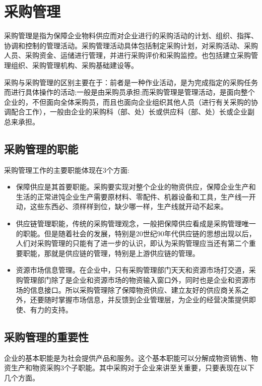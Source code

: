 \section {采购管理}

    采购管理是指为保障企业物料供应而对企业进行的采购活动的计划、组织、指挥、协调和控制的管理活动。采购管理活动具体包括制定采购计划，对采购活动、采购人员、采购资金、运储进行管理，并进行采购评价和采购监控。也包括建立采购管理组织、采购管理机构、采购基础建设等。

    采购与采购管理的区别主要在于：前者是一种作业活动，是为完成指定的采购任务而进行具体操作的活动;一般是由采购员承担;而采购管理是管理活动，是面向整个企业的，不但面向全体采购员，而且也面向企业组织其他人员（进行有关采购的协调配合工作），一般由企业的采购科（部、处）长或供应科（部、处）长或企业副总来承担。

\subsection {采购管理的职能}
    采购管理工作的主要职能体现在3个方面:

    \begin{itemize}
        \item 保障供应是其首要职能。采购要实现对整个企业的物资供应，保障企业生产和生活的正常进饨企业生产需要原材料、零配件、机器设备和工具，生产线一开动，这些东西必、须样样到位，缺少哪一样，生产线就开动不起来。

        \item 供应链管理职能，传统的采购管理观念，一般把保障供应看成是采购管理唯一的职能。但是随着社会的发展，特别是20世纪90年代供应链的思想出现以后，人们对采购管理的只能有了进一步的认识，即认为采购管理应当还有第二个重要职能，那就是供应链的管理，特别是上游供应链的管理。

        \item 资源市场信息管理。在企业中，只有采购管理部门天天和资源市场打交道，采购管理部门除了是企业和资源市场的物资输入窗口外，同时也是企业和资源市场的信息接口。所以采购管理除了保障物资供应、建立友好的供应商关系之外，还要随时掌握市场信息，并反馈到企业管理层，为企业的经营决策提供即使、有力的支持。
    \end{itemize}

\subsection {采购管理的重要性}

    企业的基本职能是为社会提供产品和服务。这个基本职能可以分解成物资销售、物资生产和物资采购3个子职能。其中采购对于企业来讲至关重要，只要表现在以下几个方面。

